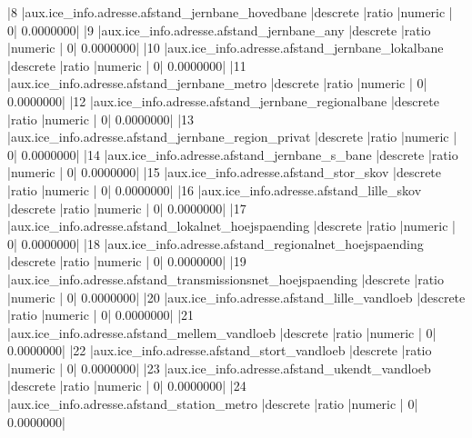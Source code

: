 \documentclass{report}
\begin{document}
\begin{Schunk}
\begin{Soutput}
|8   |aux.ice_info.adresse.afstand_jernbane_hovedbane               |descrete           |ratio          |numeric         |              0|          0.0000000|
|9   |aux.ice_info.adresse.afstand_jernbane_any                     |descrete           |ratio          |numeric         |              0|          0.0000000|
|10  |aux.ice_info.adresse.afstand_jernbane_lokalbane               |descrete           |ratio          |numeric         |              0|          0.0000000|
|11  |aux.ice_info.adresse.afstand_jernbane_metro                   |descrete           |ratio          |numeric         |              0|          0.0000000|
|12  |aux.ice_info.adresse.afstand_jernbane_regionalbane            |descrete           |ratio          |numeric         |              0|          0.0000000|
|13  |aux.ice_info.adresse.afstand_jernbane_region_privat           |descrete           |ratio          |numeric         |              0|          0.0000000|
|14  |aux.ice_info.adresse.afstand_jernbane_s_bane                  |descrete           |ratio          |numeric         |              0|          0.0000000|
|15  |aux.ice_info.adresse.afstand_stor_skov                        |descrete           |ratio          |numeric         |              0|          0.0000000|
|16  |aux.ice_info.adresse.afstand_lille_skov                       |descrete           |ratio          |numeric         |              0|          0.0000000|
|17  |aux.ice_info.adresse.afstand_lokalnet_hoejspaending           |descrete           |ratio          |numeric         |              0|          0.0000000|
|18  |aux.ice_info.adresse.afstand_regionalnet_hoejspaending        |descrete           |ratio          |numeric         |              0|          0.0000000|
|19  |aux.ice_info.adresse.afstand_transmissionsnet_hoejspaending   |descrete           |ratio          |numeric         |              0|          0.0000000|
|20  |aux.ice_info.adresse.afstand_lille_vandloeb                   |descrete           |ratio          |numeric         |              0|          0.0000000|
|21  |aux.ice_info.adresse.afstand_mellem_vandloeb                  |descrete           |ratio          |numeric         |              0|          0.0000000|
|22  |aux.ice_info.adresse.afstand_stort_vandloeb                   |descrete           |ratio          |numeric         |              0|          0.0000000|
|23  |aux.ice_info.adresse.afstand_ukendt_vandloeb                  |descrete           |ratio          |numeric         |              0|          0.0000000|
|24  |aux.ice_info.adresse.afstand_station_metro                    |descrete           |ratio          |numeric         |              0|          0.0000000|

\end{Soutput}
\end{Schunk}
\end{document}
